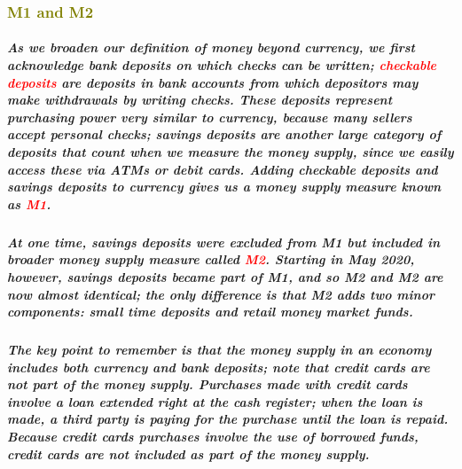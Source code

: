 \documentclass[11pt]{article} %
\begin{document}
\subsubsection*{\textcolor{olive}{M1 and M2}}
\subparagraph*{As we broaden our definition of money beyond currency, we first acknowledge bank deposits on which checks can be written; \textbf{\textcolor{red}{checkable deposits}} are deposits in bank accounts from which depositors may make withdrawals by writing checks. These deposits represent purchasing power very similar to currency, because many sellers accept personal checks; savings deposits are another large category of deposits that count when we measure the money supply, since we easily access these via ATMs or debit cards. Adding checkable deposits and savings deposits to currency gives us a money supply measure known as \textbf{\textcolor{red}{M1}}.}
\subparagraph*{At one time, savings deposits were excluded from M1 but included in broader money supply measure called \textbf{\textcolor{red}{M2}}. Starting in May 2020, however, savings deposits became part of M1, and so M2 and M2 are now almost identical; the only difference is that M2 adds two minor components: small time deposits and retail money market funds.}
\subparagraph*{The key point to remember is that the money supply in an economy includes both currency and bank deposits; note that credit cards are not part of the money supply. Purchases made with credit cards involve a loan extended right at the cash register; when the loan is made, a third party is paying for the purchase until the loan is repaid. Because credit cards purchases involve the use of borrowed funds, credit cards are not included as part of the money supply.}
\end{document}
